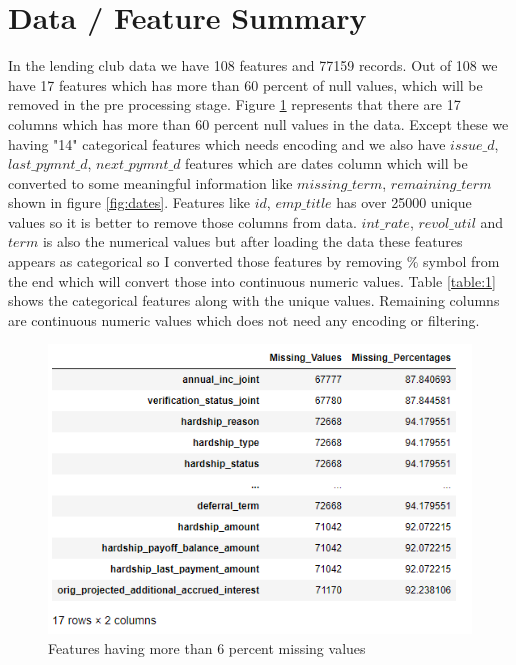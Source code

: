 \documentclass[12pt]{article}
\begin{document}
\section{Data / Feature Summary} 
In the lending club data we have 108 features and 77159 records. Out of 108 we have 17 features which has more than 60 percent of null values, which will be removed in the pre processing stage. Figure \ref{fig:MissingValues} represents that there are 17 columns which has more than 60 percent null values in the data. Except these we having "14" categorical features which needs encoding and we also have  $issue\_d$, $last\_pymnt\_d$, $next\_pymnt\_d$ features which are dates column which will be converted to some meaningful information like $missing\_term$, $remaining\_term$ shown in figure \ref{fig:dates}. Features like $id$, $emp\_title$ has over 25000 unique values so it is better to remove those columns from data. $int\_rate$, $revol\_util$ and $term$ is also the numerical values but after loading the data these features appears as categorical so I converted those features by removing $\%$ symbol from the end which will convert those into continuous numeric values. Table \ref{table:1} shows the categorical features along with the unique values. Remaining columns are continuous numeric values which does not need any encoding or filtering.
\begin{figure}[h!]
	\centering
	\includegraphics{MissingValues.png}
	\caption{Features having more than 6 percent missing values}
	\label{fig:MissingValues}
\end{figure}
 
\end{document}

